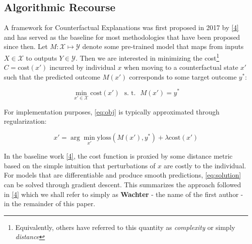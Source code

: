 \documentclass[conference,final,]{IEEEtran}
\theoremstyle{definition}
\theoremstyle{definition}
\theoremstyle{definition}
\theoremstyle{definition}
\theoremstyle{remark}
\begin{document}
\hypertarget{related-recourse}{%
\subsection{Algorithmic Recourse}\label{related-recourse}}

A framework for Counterfactual Explanations was first proposed in 2017 by \protect\hyperlink{ref-wachter2017counterfactual}{{[}4{]}} and has served as the baseline for most methodologies that have been proposed since then. Let \(M: \mathcal{X} \mapsto \mathcal{Y}\) denote some pre-trained model that maps from inputs \(X \in \mathcal{X}\) to outputs \(Y \in \mathcal{Y}\). Then we are interested in minimizing the cost\footnote{Equivalently, others have referred to this quantity as \emph{complexity} or simply \emph{distance}} \(C=\text{cost}(x\prime)\) incurred by individual \(x\) when moving to a counterfactual state \(x\prime\) such that the predicted outcome \(M(x\prime)\) corresponds to some target outcome \(y^*\):

\begin{equation}
\min_{x\prime \in \mathcal{X}} \text{cost}(x\prime) \ \ \ \mbox{s. t.} \ \ \ M(x\prime) = y^* \label{eq:obj}
\end{equation}

For implementation purposes, \eqref{eq:obj} is typically approximated through regularization:

\begin{equation}
x\prime = \arg \min_{x\prime}  \text{yloss}(M(x\prime),y^*) + \lambda \text{cost}(x\prime) \label{eq:solution}
\end{equation}

In the baseline work \protect\hyperlink{ref-wachter2017counterfactual}{{[}4{]}}, the cost function is proxied by some distance metric based on the simple intuition that perturbations of \(x\) are costly to the individual. For models that are differentiable and produce smooth predictions, \eqref{eq:solution} can be solved through gradient descent. This summarizes the approach followed in \protect\hyperlink{ref-wachter2017counterfactual}{{[}4{]}} which we shall refer to simply as \textbf{Wachter} - the name of the first author - in the remainder of this paper.
\end{document}
